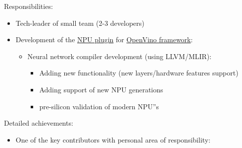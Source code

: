 \documentclass[a4paper,11pt]{memoir}
\newif\ifdetailed
\begin{document}
{
\ifdetailed
Contact info:
\begin{itemize}
	\item Address: Ireland, Leixlip, Co. Kildare, Collinstown Industrial Park
	\item Phone/e-mail: (+353 1) 606 2996 / HR.Support.and.Services@intel.com
\end{itemize}
\fi
Responsibilities:
\begin{itemize}
	\item Tech-leader of small team (2-3 developers)
	\ifdetailed
		\begin{itemize}
		\item Analyze voluminous tasks, make decomposition and an execution plan
		\item Prioritize tasks and provide time estimations
		\item Form and delegate clear tasks to teammates
		\item Review PR's and provide feadback
	\end{itemize}
	\fi
      \item Development of the \href{https://github.com/openvinotoolkit/npu_plugin}{NPU plugin} for \href{https://github.com/openvinotoolkit/openvino}{OpenVino framework}:
	\begin{itemize}
		\item Neural network compiler development (using LLVM/MLIR):
		\begin{itemize}
			\item Adding new functionality (new layers/hardware features support)
			\item Adding support of new NPU generations
			\item pre-silicon validation of modern NPU''s
		\end{itemize}
		\ifdetailed
			\item NPU Runtime development:
			\begin{itemize}
				\item Adding new kernels/layers support
			\end{itemize}
		\fi
	\end{itemize}	
\end{itemize}
\ifdetailed
Detailed achievements:
\begin{itemize}
	\item One of the key contributors with personal area of responsibility:
	\begin{itemize} 

\end{itemize}
\end{itemize}}
\end{document}
